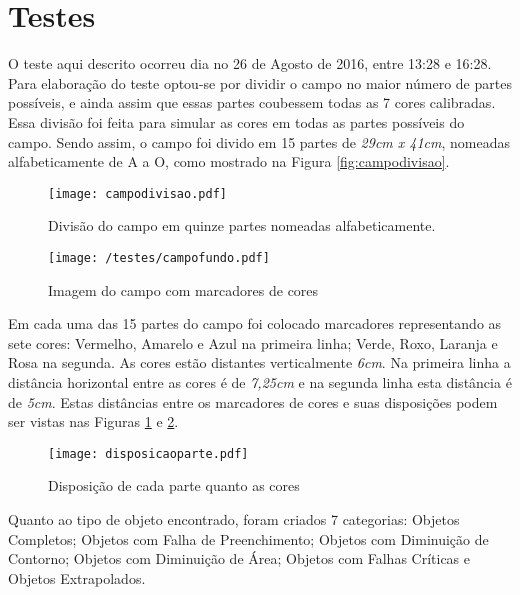  \section{Testes}
O teste aqui descrito ocorreu dia no 26 de Agosto de 2016, entre 13:28 e 16:28.
Para elaboração do teste optou-se por dividir o campo no maior número de partes possíveis, e ainda assim que essas partes coubessem todas as 7 cores calibradas. Essa divisão foi feita para simular as cores em todas as partes possíveis do campo. Sendo assim, o campo foi divido em 15 partes de \textit{29cm x 41cm}, nomeadas alfabeticamente de A a O, como mostrado na Figura \ref{fig:campodivisao}.	
	\begin{figure}[H]
		\begin{minipage}[b]{0.45\linewidth}
				\centering
				\texttt{[image: campodivisao.pdf]}
				\caption{Divisão do campo em quinze partes nomeadas alfabeticamente.}
				\label{fig:campodivisao}
		
		\end{minipage}
		\hspace{0.5cm}
		\begin{minipage}[b]{0.45\linewidth}
			\centering
			\texttt{[image: /testes/campofundo.pdf]}
			\caption{Imagem do campo com marcadores de cores}
			\label{fig:figure2}
		\end{minipage}
	\end{figure}
	
Em cada uma das 15 partes do campo foi colocado marcadores representando as sete cores: Vermelho, Amarelo e Azul na primeira linha; Verde, Roxo, Laranja e Rosa na segunda. As cores estão distantes verticalmente \textit{6cm}. Na primeira linha a distância horizontal entre as cores é de \textit{7,25cm} e na segunda linha esta distância é de \textit{5cm}. Estas distâncias entre os marcadores de cores e suas disposições podem ser vistas nas Figuras \ref{fig:figure2} e \ref{fig:figure1}.

\begin{figure}[H]
	\centering
	\texttt{[image: disposicaoparte.pdf]}
	\caption{Disposição de cada parte quanto as cores}
	\label{fig:figure1}
\end{figure}

Quanto ao tipo de objeto encontrado, foram criados 7 categorias: Objetos Completos; Objetos com Falha de Preenchimento; Objetos com Diminuição de Contorno; Objetos com Diminuição de Área; Objetos com Falhas Críticas e Objetos Extrapolados.


